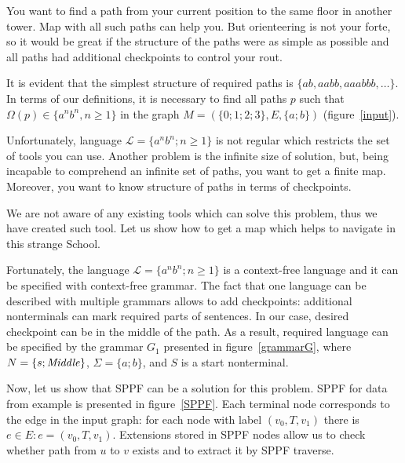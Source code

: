 You want to find a path from your current position to the same floor in another tower. 
Map with all such paths can help you.
But orienteering is not your forte, so it would be great if the structure of the paths were as simple as possible and all paths had additional checkpoints to control your rout.

It is evident that the simplest structure of required paths is $\{ab, aabb, aaabbb, \dots\}$.
In terms of our definitions, it is necessary to find all paths $p$ such that $\Omega(p) \in \{a^n b^n, n \geq 1\}$ in the graph $M=(\{0;1;2;3\},E,\{a;b\})$ (figure~\ref{input}).

Unfortunately, language $\mathcal{L} = \{a^n b^n; n \geq 1\}$ is not regular which restricts the set of tools you can use. 
Another problem is the infinite size of solution, but, being incapable to comprehend an infinite set of paths, you want to get a finite map.  
Moreover, you want to know structure of paths in terms of checkpoints.

We are not aware of any existing tools which can solve this problem, thus we have created such tool.
Let us show how to get a map which helps to navigate in this strange School.

Fortunately, the language $\mathcal{L} = \{a^n b^n; n \geq 1\}$ is a context-free language and it can be specified with context-free grammar. 
The fact that one language can be described with multiple grammars allows to add checkpoints: additional nonterminals can mark required parts of sentences.
In our case, desired checkpoint can be in the middle of the path.
As a result, required language can be specified by the grammar $G_1$ presented in figure~\ref{grammarG}, where $N = \{s; \text{\textit{Middle}}\}$, $\Sigma = \{a; b\}$, and $S$ is a start nonterminal.

Now, let us show that SPPF can be a solution for this problem.
SPPF for data from example is presented in figure~\ref{SPPF}.
Each terminal node corresponds to the edge in the input graph: for each node with label $(v_0, T, v_1)$ there is $e\in E: e=(v_0,T,v_1)$.
Extensions stored in SPPF nodes allow us to check whether path from $u$ to $v$ exists and to extract it by SPPF traverse. 


